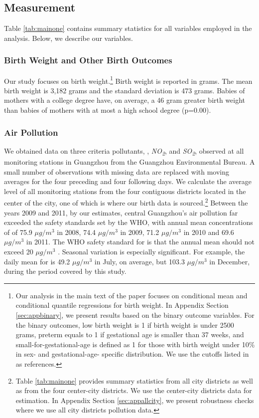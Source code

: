 \subsection{Measurement\label{measurement}}

Table \ref{tab:mainone} contains summary statistics for all variables employed in the
analysis. Below, we describe our variables.

\subsubsection{Birth Weight and Other Birth Outcomes\label{birth-weight}}

Our study focuses on birth weight.\footnote{Our analysis in the main text of the paper focuses on conditional mean and conditional quantile regressions for birth weight. In Appendix Section \ref{sec:appbinary}, we present results based on the binary outcome variables. For the binary outcomes, low birth weight is 1 if birth weight is under 2500 grams, preterm equals to 1 if gestational age is smaller than 37 weeks, and small-for-gestational-age is defined as 1 for those with birth weight under 10\% in sex- and gestational-age- specific distribution. We use the cutoffs listed in \textcite{Zhu_chinese_2015} as references.} Birth weight is reported in grams. The mean birth weight is 3,182 grams
and the standard deviation is 473 grams. Babies of mothers with a college degree have, on
average, a 46 gram greater birth weight than babies of mothers with at
most a high school degree  (p=0.00). 

\subsubsection{Air Pollution\label{air-pollution}}

We obtained data on three criteria pollutants, \PARPMTEN,
\emph{NO\textsubscript{2}}, and
\emph{SO\textsubscript{2}}, observed at all monitoring stations in Guangzhou 
from the Guangzhou Environmental Bureau. A small number of observations with missing data
are replaced with moving averages for the four preceding and four following days. We calculate the average level of all monitoring stations from the four contiguous districts located in the center of the city, one of which is where our birth data is sourced.\footnote{Table \ref{tab:mainone} provides \PARPMTEN summary statistics from all city districts as well as from the four center-city districts. We use the center-city districts data for estimation. In Appendix Section \ref{sec:appallcity}, we present robustness checks where we use all city districts pollution data.} Between the
years 2009 and 2011, by our estimates, central Guangzhou's air pollution far
exceeded the safety standards set by the WHO, with annual mean
concentrations of \PARPMTEN of 75.9 $\mu g/m^3$ in  2008, 74.4
$\mu g/m^3$ in 2009, 71.2 $\mu g/m^3$ in 2010
and 69.6 $\mu g/m^3$ in 2011. The WHO
safety standard for \PARPMTEN is that the annual mean should not exceed 20 $\mu g/m^3$ \autocite{world_health_organization_ambient_2018}. Seasonal variation is
especially significant. For example, the daily mean for \PARPMTEN is 49.2
$\mu g/m^3$ in July, on average, but 103.3
$\mu g/m^3$ in December, during the period covered by this study.

